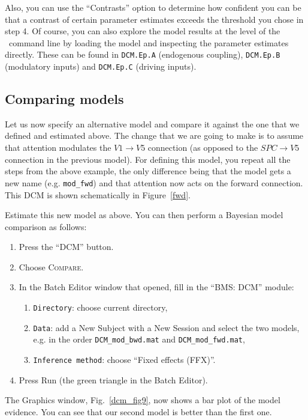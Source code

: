 Also, you can use the ``Contrasts'' option to determine how confident you can be that a contrast of certain parameter estimates exceeds the threshold you chose in step 4.
Of course, you can also explore the model results at the level of the \matlab\ command line by loading the model and inspecting the parameter estimates directly. These can be found in \texttt{DCM.Ep.A} (endogenous coupling), \texttt{DCM.Ep.B} (modulatory inputs) and \texttt{DCM.Ep.C} (driving inputs).

\subsection{Comparing models}

Let us now specify an alternative model and compare it against the one that we defined and estimated above. The change that we are going to make is to assume that attention modulates the $V1 \rightarrow V5$ connection (as opposed to the $SPC \rightarrow V5$ connection in the previous model). For defining this model, you repeat all the steps from the above example, the only difference being that the model gets a new name (e.g. \verb!mod_fwd!) and that attention now acts on the forward connection. This DCM is shown schematically in Figure~\ref{fwd}.

Estimate this new model as above. You can then perform a Bayesian model comparison as follows:
\begin{enumerate}
 \item Press the ``DCM'' button.
 \item Choose \textsc{Compare}.
 \item In the Batch Editor window that opened, fill in the ``BMS: DCM'' module:
 \begin{enumerate}
   \item \texttt{Directory}: choose current directory,
   \item \texttt{Data}: add a New Subject with a New Session and select the two models, e.g. in the order \texttt{DCM\_mod\_bwd.mat} and \texttt{DCM\_mod\_fwd.mat},
   \item \texttt{Inference method}: choose ``Fixed effects (FFX)''.
 \end{enumerate}
 \item Press Run (the green triangle in the Batch Editor).
\end{enumerate}

The Graphics window, Fig.~\ref{dcm_fig9}, now shows a bar plot of the model evidence. You can see that our second model is better than the first one.


